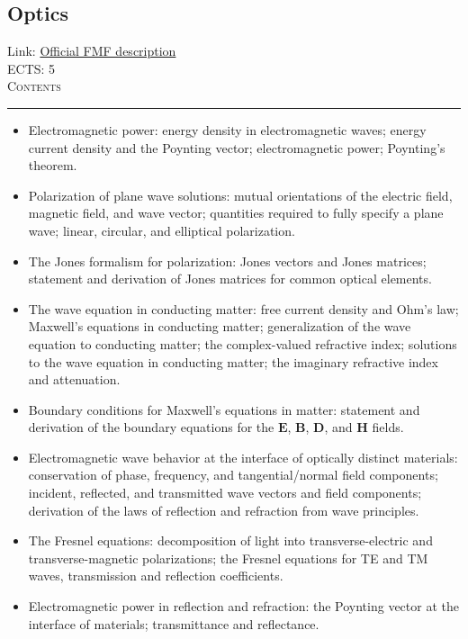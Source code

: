 \documentclass[11pt, a4paper]{article}
\renewcommand{\vec}{\bm}
\newenvironment{course}[3]{
\subsection{#1}%
Link: \href{#2}{Official FMF description}\\%
ECTS: #3%
\vspace{1ex}
\\
{\large \textsc{Contents}}\\[-0.9ex]%
\rule{\textwidth}{0.5pt}
\vspace{-3ex}
}
{}
\newenvironment{chapter}[1]{
\begin{tcolorbox}[title=#1, breakable]
}
{\end{tcolorbox}}
\begin{document}
\begin{course}{Optics}{https://www.fmf.uni-lj.si/en/study-physics/programmes/1fiz/2020/7000777/courses/1165/}{5}
\begin{chapter}{Fundamentals of wave optics}
\begin{itemize}
            \item Electromagnetic power: energy density in electromagnetic waves; energy current density and the Poynting vector; electromagnetic power; Poynting's theorem.

            \item Polarization of plane wave solutions: mutual orientations of the electric field, magnetic field, and wave vector; quantities required to fully specify a plane wave; linear, circular, and elliptical polarization.

            \item The Jones formalism for polarization: Jones vectors and Jones matrices; statement and derivation of Jones matrices for common optical elements.

            \item The wave equation in conducting matter: free current density and Ohm's law; Maxwell's equations in conducting matter; generalization of the wave equation to conducting matter; the complex-valued refractive index; solutions to the wave equation in conducting matter; the imaginary refractive index and attenuation.
        
        \end{itemize}
    \end{chapter}

    \begin{chapter}{Reflection and refraction}
        \begin{itemize}
        
            \item Boundary conditions for Maxwell's equations in matter: statement and derivation of the boundary equations for the $ \vec{E} $, $ \vec{B} $, $ \vec{D} $, and $ \vec{H} $ fields.

            \item Electromagnetic wave behavior at the interface of optically distinct materials: conservation of phase, frequency, and tangential/normal field components; incident, reflected, and transmitted wave vectors and field components; derivation of the laws of reflection and refraction from wave principles.

            \item The Fresnel equations: decomposition of light into transverse-electric and transverse-magnetic polarizations; the Fresnel equations for TE and TM waves, transmission and reflection coefficients.

            \item Electromagnetic power in reflection and refraction: the Poynting vector at the interface of materials; transmittance and reflectance.


\end{itemize}
\end{chapter}
\end{course}
\end{document}
